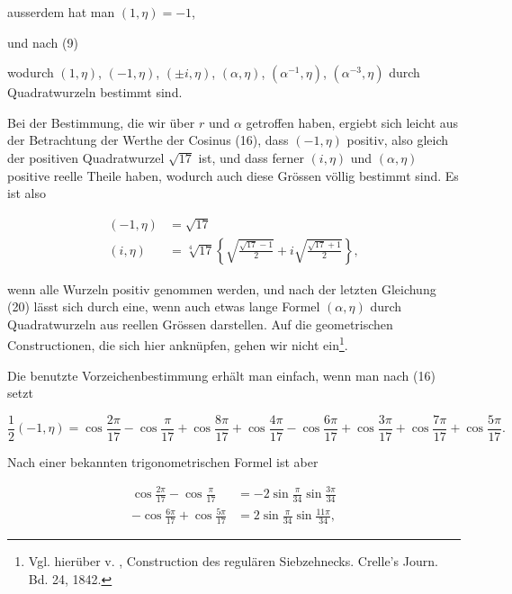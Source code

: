 
ausserdem hat man $(1,\eta) = -1$,


und nach (9)


wodurch $(1,\eta)$, $(-1,\eta)$, $(\pm i,\eta)$, $(\alpha,\eta)$, $(\alpha^{-1},\eta)$, $(\alpha^{-3},\eta)$ durch
Quadratwurzeln bestimmt sind.

Bei der Bestimmung, die wir über $r$ und $\alpha$ getroffen haben,
ergiebt sich leicht aus der Betrachtung der Werthe der Cosinus
(16), dass $(-1,\eta)$ positiv, also gleich der positiven Quadratwurzel
$\sqrt{17}$ ist, und dass ferner $(i,\eta)$ und $(\alpha,\eta)$ positive reelle
Theile haben, wodurch auch diese Grössen völlig bestimmt sind.
Es ist also

\[
\begin{aligned}
(-1,\eta) &= \sqrt{17} \\
(i,\eta) &= \sqrt[4]{17}\left\{\sqrt{\frac{\sqrt{17}-1}{2}} + i\sqrt{\frac{\sqrt{17}+1}{2}}\right\},
\end{aligned}
\]

wenn alle Wurzeln positiv genommen werden, und nach der
letzten Gleichung (20) lässt sich durch eine, wenn auch etwas
lange Formel $(\alpha,\eta)$ durch Quadratwurzeln aus reellen Grössen
darstellen. Auf die geometrischen Constructionen, die sich hier
anknüpfen, gehen wir nicht ein\footnote{Vgl. hierüber v. , Construction des regulären Siebzehnecks. Crelle's Journ. Bd. 24, 1842.}.

Die benutzte Vorzeichenbestimmung erhält man einfach,
wenn man nach (16) setzt

\[
\frac{1}{2}(-1,\eta) = \cos\frac{2\pi}{17} - \cos\frac{\pi}{17} + \cos\frac{8\pi}{17} + \cos\frac{4\pi}{17}
- \cos\frac{6\pi}{17} + \cos\frac{3\pi}{17} + \cos\frac{7\pi}{17} + \cos\frac{5\pi}{17}.
\]

Nach einer bekannten trigonometrischen Formel ist aber

\[
\begin{aligned}
\cos\frac{2\pi}{17} - \cos\frac{\pi}{17} &= -2\sin\frac{\pi}{34}\sin\frac{3\pi}{34} \\
-\cos\frac{6\pi}{17} + \cos\frac{5\pi}{17} &= 2\sin\frac{\pi}{34}\sin\frac{11\pi}{34},
\end{aligned}
\]
